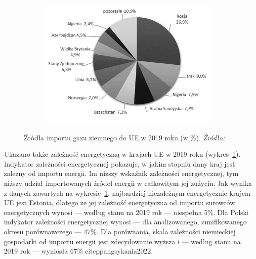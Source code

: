 \documentclass[polish, twoside, 12pt, a4paper]{article}
\theoremstyle{definition}
\theoremstyle{plain}
\theoremstyle{remark}
\begin{document}
\begin{figure}[hbt]
  \centering

  \begin{subfigure}[t]{0.45\textwidth}
    \hspace{-1cm}
    \includegraphics[width=1.3\textwidth]{./out_figures/figure_3}
  \end{subfigure}

  \captionsetup{margin=10pt,font=small,labelfont=bf,width=.8\textwidth}

  \caption[Źródła importu gazu ziemnego do UE w 2019 roku (w \%).]{Źródła importu gazu ziemnego do UE w 2019 roku (w \%). \textit{Źródło:} \cite{pangsykania2022}}\label{fig:x3}
\end{figure}

Ukazano także zależność energetyczną w krajach UE w 2019 roku (wykres~\ref{fig:x3}). Indykator zależności energetycznej pokazuje, w jakim stopniu dany kraj jest zależny od importu energii. Im niższy wskaźnik zależności energetycznej, tym niższy udział importowanych źródeł energii w całkowitym jej zużyciu. Jak wynika z danych zawartych na wykresie~\ref{fig:x3}, najbardziej niezależnym energetycznie krajem UE jest Estonia, dlatego że jej zależność energetyczna od importu surowców energetycznych wynosi --- według stanu na 2019 rok --- niespełna 5\%. Dla Polski indykator zależności energetycznej wynosi --- dla analizowanego, zunifikowanego okresu porównawczego --- 47\%. Dla porównania, skala zależności niemieckiej gospodarki od importu energii jest zdecydowanie wyższa i --- według stanu na 2019 rok --- wyniosła 67\% citep{pangsykania2022}.
\end{document}
